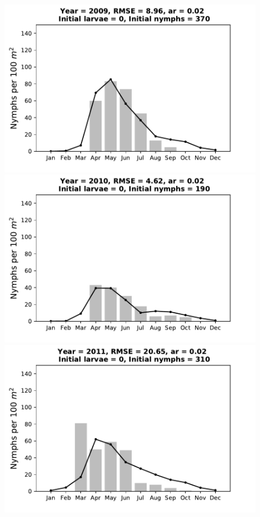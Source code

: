 \documentclass[a4paper, 11pt]{scrartcl}
\begin{document}
\begin{figure}[h!]
\centering
\begin{minipage}[c]{0.40\linewidth}
\includegraphics[width=\linewidth]{figures/s4/s4_2009}
\end{minipage}
\begin{minipage}[c]{0.40\linewidth}
\includegraphics[width=\linewidth]{figures/s4/s4_2010}
\end{minipage}
\begin{minipage}[c]{0.40\linewidth}
\includegraphics[width=\linewidth]{figures/s4/s4_2011}

\end{minipage}
\end{figure}
\end{document}
